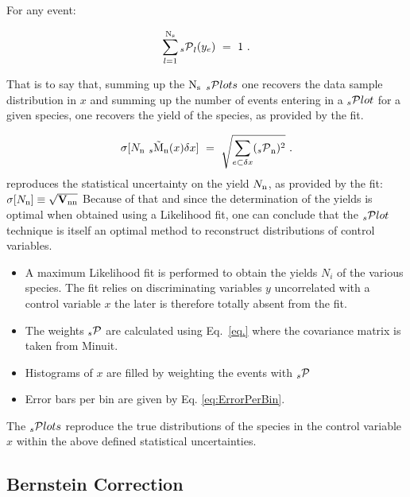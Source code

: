 \documentclass[11pt]{article}
\begin{document}
For any event:

 \begin{equation}
\sum_{l=1}^{{\rm N}_{\rm s}} {_s{\cal P}}_l(y_e) ~=~1 ~.
\end{equation}

That is to say that, summing up the 
 ${\rm N}_{\rm s}$
$\hbox {$_s$}{\cal P}lots$  one recovers the data sample distribution in $x$  and summing up the number of events entering in a 
 $\hbox{$_s$}{\cal P}lot$
for a given species, one recovers the yield of the species, as provided by the fit.


 \begin{equation}
\sigma[N_{\rm n}\  _s\tilde{\rm M}_{\rm n}(x) {\delta x}]~=~\sqrt{\sum_{e \subset {\delta x}} ({_s{\cal P}}_{\rm n})^2} ~.
\end{equation}
 reproduces the statistical uncertainty on the yield  $N_{\rm n}$, as provided by the fit: 
$\sigma[N_{\rm n}]\equiv\sqrt{\hbox{\bf V}_{{\rm n}{\rm n}}}$ 
Because of that and since the determination of the yields is optimal
when obtained using a Likelihood fit, one can conclude that the
 $\hbox{$_s$}{\cal P}lot$
  technique is itself an optimal method to reconstruct distributions of control variables.



\begin{itemize}

\item A maximum Likelihood fit is performed to obtain the yields $N_i$ of the various species. 
The fit relies on discriminating variables $y$ uncorrelated with a control variable $x$ 
the later is therefore totally absent from the fit. 

 \item The weights ${_s{\cal P}}$ are calculated using Eq.~\ref{eq.} where the covariance matrix is taken from Minuit.

 \item Histograms of $x$ are filled by weighting the events with ${_s{\cal P}}$  

 \item Error bars per bin are given by Eq. \ref{eq:ErrorPerBin}. 
\end{itemize}

The $\hbox {$_s$}{\cal P}lots$ reproduce the true distributions of the species in the control variable $x$  within the above defined statistical uncertainties.





\subsection{Bernstein Correction}
\end{document}
